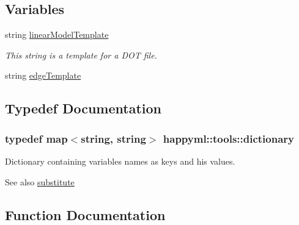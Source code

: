 \subsection*{Variables}
\begin{DoxyCompactItemize}
\item 
string \hyperlink{namespacehappyml_1_1tools_ac77ec5d0f63f0beee949d5f246e40d79}{linear\+Model\+Template}
\begin{DoxyCompactList}\small\item\em This string is a template for a D\+OT file. \end{DoxyCompactList}\item 
string \hyperlink{namespacehappyml_1_1tools_a20d872d51bf3b6d07fda7ad88ae36892}{edge\+Template}
\end{DoxyCompactItemize}


\subsection{Typedef Documentation}
\subsubsection[{\texorpdfstring{dictionary}{dictionary}}]{\setlength{\rightskip}{0pt plus 5cm}typedef map$<$string, string$>$ {\bf happyml\+::tools\+::dictionary}}\hypertarget{namespacehappyml_1_1tools_a2c4240e249e861d6bee0eb8a0a075906}{}\label{namespacehappyml_1_1tools_a2c4240e249e861d6bee0eb8a0a075906}


Dictionary containing variables names as keys and his values. 

\begin{DoxySeeAlso}{See also}
\hyperlink{namespacehappyml_1_1tools_a4b070b3500ff510ca3e80bafa1bb5a18}{substitute} 
\end{DoxySeeAlso}


\subsection{Function Documentation}
